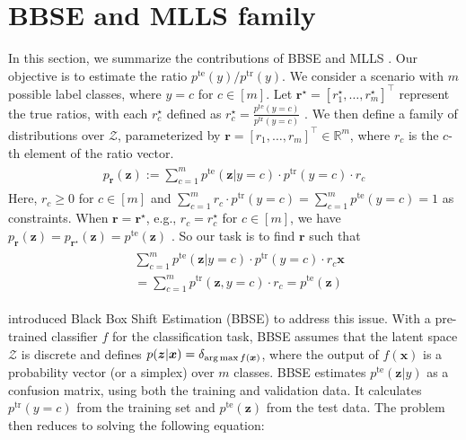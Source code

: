 
\newpage
\section{BBSE and MLLS family}\label{app:bbse_mlls_family}
\label{IRforNOLS}

In this section, we summarize the contributions of BBSE \citep{bbse} and MLLS \citep{mlls}. Our objective is to estimate the ratio ${p^{\text{te}}(y)}/{p^{\text{tr}}(y)}$. We consider a scenario with $m$ possible label classes, where $y = c$ for $c \in [m]$. Let $\boldsymbol{r}^{\star} = [r^{\star}_{1}, \ldots, r^{\star}_{m}]^{\top}$ represent the true ratios, with each $r^{\star}_{c}$ defined as $r^{\star}_{c} = \frac{p^{\text{te}}(y = c)}{p^{\text{tr}}(y = c)}$ \citep{mlls}. We then define a family of distributions over $\mathcal{Z}$, parameterized by $\boldsymbol{r} = [r_1, \ldots, r_m]^{\top} \in \mathbb{R}^m$, where $r_c$ is the $c$-th element of the ratio vector.
\begin{align}
\begin{split}
p_{\boldsymbol{r}}(\boldsymbol{z}) := \sum_{c=1}^{m} {p^{\text{te}}(\boldsymbol{z}|y=c)} \cdot p^{\text{tr}}(y=c) \cdot r_c \label{p_w_z}
\end{split}
\end{align}
Here, ${r_{c} \geq 0}$ for $c \in [m]$ and $ \sum_{c=1}^{m} r_c \cdot p^{\text{tr}}(y=c) = \sum_{c=1}^{m} p^{\text{te}}(y=c)= 1 $ as constraints. When $\boldsymbol{r} = \boldsymbol{r}^{\star}$, e.g., $r_c = r^{\star}_c$ for $c \in [m]$, we have $p_{\boldsymbol{r}}(\boldsymbol{z}) = p_{\boldsymbol{r}^{\star}}(\boldsymbol{z}) = p^{\text{te}}(\boldsymbol{z})$ \citep{mlls}. So our task is to find $\boldsymbol{r}$ such that
\begin{align}\label{IWpwz_estimate_w*}
\begin{split}
&\sum_{c=1}^{m} {p^{\text{te}}(\boldsymbol{z}|y=c)} \cdot p^{\text{tr}}(y=c) \cdot r_c \boldsymbol{x}\\
&= 
\sum_{c=1}^{m} {p^{\text{tr}}(\boldsymbol{z}, y=c)}\cdot r_c =
p^{\text{te}}(\boldsymbol{z})
\end{split}
\end{align}

\citet{bbse} introduced Black Box Shift Estimation (BBSE) to address this issue. With a pre-trained classifier \( f \) for the classification task, BBSE assumes that the latent space \(\mathcal{Z}\) is discrete and defines \( p(\boldsymbol{z}|\boldsymbol{x}) = \delta_{\operatorname*{arg\,max} f(\boldsymbol{x})} \), where the output of \( f(\boldsymbol{x}) \) is a probability vector (or a simplex) over \( m \) classes. BBSE estimates \( p^{\text{te}}(\boldsymbol{z}|y) \) as a confusion matrix, using both the training and validation data. It calculates \( p^{\text{tr}}(y = c) \) from the training set and \( p^{\text{te}}(\boldsymbol{z}) \) from the test data. The problem then reduces to solving the following equation:

